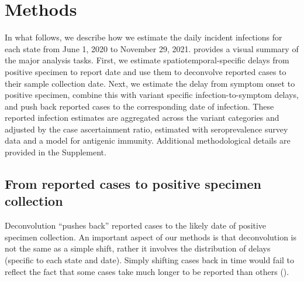 \section{Methods}
\label{sec:methods}


In what follows, we describe how we estimate the daily incident infections for
each \US state from June 1, 2020 to November 29, 2021.
 provides a visual summary of the major
analysis tasks. First, we estimate spatiotemporal-specific delays from positive
specimen to report date and use them to deconvolve reported cases to their
sample collection date. Next, we estimate the delay from symptom onset to
positive specimen, combine this with variant specific infection-to-symptom
delays, and push back reported cases to the corresponding date of infection.
These reported infection estimates are aggregated across the variant categories
and adjusted by the case ascertainment ratio, estimated with seroprevalence
survey data and a model for antigenic immunity. Additional methodological
details are provided in the Supplement.

\subsection{From reported cases to positive specimen collection}
\label{sec:step1}

Deconvolution ``pushes back'' reported cases to the likely date of positive
specimen collection. An important aspect of our methods is that deconvolution is
not the same as a simple shift, rather it involves the distribution of delays
(specific to each state and date).
Simply shifting cases back in time would fail to reflect the fact that some cases take
much longer to be reported than others 
().

